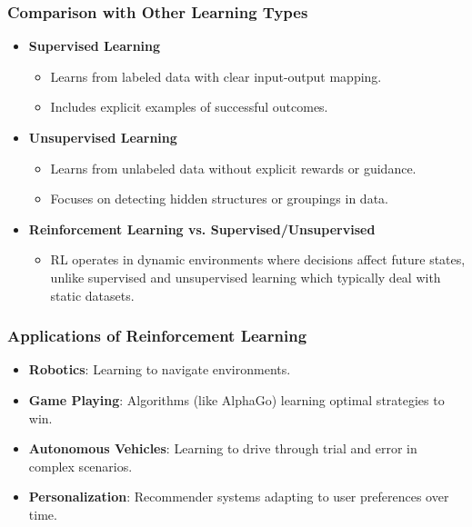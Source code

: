 \documentclass[aspectratio=169]{beamer}
\begin{document}
\begin{frame}[fragile]
    \frametitle{Comparison with Other Learning Types}
    \begin{itemize}
        \item \textbf{Supervised Learning}
            \begin{itemize}
                \item Learns from labeled data with clear input-output mapping.
                \item Includes explicit examples of successful outcomes.
            \end{itemize}

        \item \textbf{Unsupervised Learning}
            \begin{itemize}
                \item Learns from unlabeled data without explicit rewards or guidance.
                \item Focuses on detecting hidden structures or groupings in data.
            \end{itemize}

        \item \textbf{Reinforcement Learning vs. Supervised/Unsupervised}
            \begin{itemize}
                \item RL operates in dynamic environments where decisions affect future states, unlike supervised and unsupervised learning which typically deal with static datasets.
            \end{itemize}
    \end{itemize}
\end{frame}

\begin{frame}[fragile]
    \frametitle{Applications of Reinforcement Learning}
    \begin{itemize}
        \item \textbf{Robotics}: Learning to navigate environments.
        \item \textbf{Game Playing}: Algorithms (like AlphaGo) learning optimal strategies to win.
        \item \textbf{Autonomous Vehicles}: Learning to drive through trial and error in complex scenarios.
        \item \textbf{Personalization}: Recommender systems adapting to user preferences over time.
    \end{itemize}
\end{frame}
\end{document}
